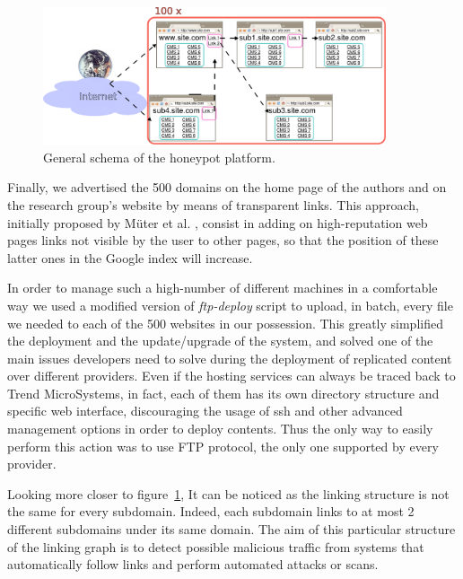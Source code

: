 \begin{figure}[tbh]
\centerline{\includegraphics[width=0.9\textwidth]{Images/GeneralSchema.png}}
\caption{General schema of the honeypot platform.\label{fig:genSchema}}
\end{figure}

Finally, we advertised the 500 domains on the home page of the authors and on the research group's website by means of transparent links. This approach, initially proposed by M\"uter et al. \cite{hihat}, consist in adding on high-reputation web pages links not visible by the user to other pages, so that the position of these latter ones in the Google index will increase.

In order to manage such a high-number of different machines in a comfortable way we used a modified version of \emph{ftp-deploy} script to upload, in batch, every file we needed to each of the 500 websites in our possession. This greatly simplified the deployment and the update/upgrade of the system, and solved one of the main issues developers need to solve during the deployment of replicated content over different providers. Even if the hosting services can always be traced back to Trend MicroSystems, in fact, each of them has its own directory structure and specific web interface, discouraging the usage of ssh and other advanced management options in order to deploy contents. Thus the only way to easily perform this action was to use FTP protocol, the only one supported by every provider.

Looking more closer to figure~\ref{fig:genSchema}, It can be noticed as the linking structure is not the same for every subdomain. Indeed, each subdomain links to at most 2 different subdomains under its same domain. The aim of this particular structure of the linking graph is to detect possible malicious traffic from systems that automatically follow links and perform automated attacks or scans.

